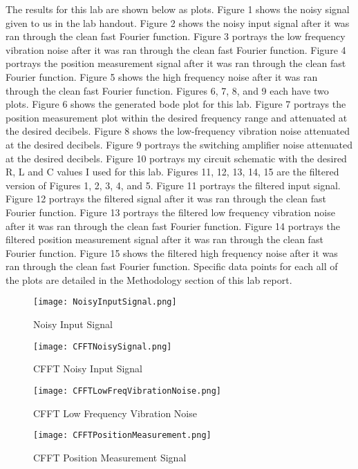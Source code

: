 \documentclass[12pt]{report}
\begin{document}
The results for this lab are shown below as plots. Figure 1 shows the noisy signal given to us in the lab handout. Figure 2 shows the noisy input signal after it was ran through the clean fast Fourier function. Figure 3 portrays the low frequency vibration noise after it was ran through the clean fast Fourier function. Figure 4 portrays the position measurement signal after it was ran through the clean fast Fourier function. Figure 5 shows the high frequency noise after it was ran through the clean fast Fourier function. Figures 6, 7, 8, and 9 each have two plots. Figure 6 shows the generated bode plot for this lab. Figure 7 portrays the position measurement plot within the desired frequency range and attenuated at the desired decibels. Figure 8 shows the low-frequency vibration noise attenuated at the desired decibels. Figure 9 portrays the switching amplifier noise attenuated at the desired decibels. Figure 10 portrays my circuit schematic with the desired R, L and C values I used for this lab. Figures 11, 12, 13, 14, 15 are the filtered version of Figures 1, 2, 3, 4, and 5. Figure 11 portrays the filtered input signal. Figure 12 portrays the filtered signal after it was ran through the clean fast Fourier function. Figure 13 portrays the filtered low frequency vibration noise after it was ran through the clean fast Fourier function. Figure 14 portrays the filtered position measurement signal after it was ran through the clean fast Fourier function. Figure 15 shows the filtered high frequency noise after it was ran through the clean fast Fourier function. Specific data points for each all of the plots are detailed in the Methodology section of this lab report. 



\begin{figure}
\texttt{[image: NoisyInputSignal.png]}
\caption{Noisy Input Signal}
\end{figure}


\begin{figure}
\texttt{[image: CFFTNoisySignal.png]}
\caption{CFFT Noisy Input Signal}
\end{figure}


\begin{figure}
\texttt{[image: CFFTLowFreqVibrationNoise.png]}
\caption{CFFT Low Frequency Vibration Noise}
\end{figure}

\begin{figure}
\texttt{[image: CFFTPositionMeasurement.png]}
\caption{CFFT Position Measurement Signal}
\end{figure}
\end{document}
